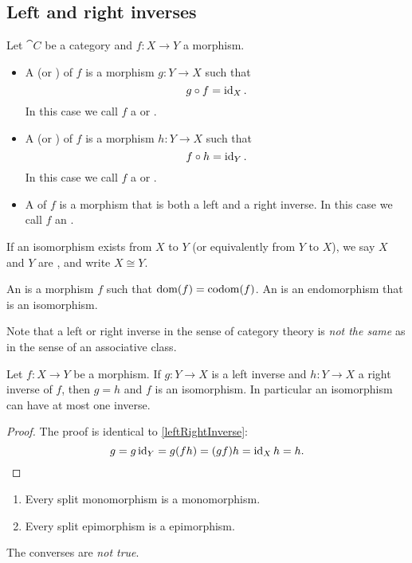 \subsection{Left and right inverses}
\begin{definition}
Let $\cat{C}$ be a category and $f:X\to Y$ a morphism.
\begin{itemize}
\item A  (or ) of $f$ is a morphism $g: Y\to X$ such that
\[ g\circ f = \operatorname{id}_X. \]
In this case we call $f$ a  or .
\item A  (or ) of $f$ is a morphism $h: Y\to X$ such that
\[ f\circ h = \operatorname{id}_Y. \]
In this case we call $f$ a  or .
\item A  of $f$ is a morphism that is both a left and a right inverse. In this case we call $f$ an .
\end{itemize}
If an isomorphism exists from $X$ to $Y$ (or equivalently from $Y$ to $X$), we say $X$ and $Y$ are , and write $X\cong Y$.
\end{definition}

An  is a morphism $f$ such that $\operatorname{dom}(f) = \operatorname{codom}(f)$. An  is an endomorphism that is an isomorphism.

Note that a left or right inverse in the sense of category theory is \emph{not the same} as in the sense of an associative class.

\begin{lemma}
Let $f:X\to Y$ be a morphism. If $g: Y\to X$ is a left inverse and $h: Y\to X$ a right inverse of $f$, then $g=h$ and $f$ is an isomorphism. In particular an isomorphism can have at most one inverse.
\end{lemma}
\begin{proof}
The proof is identical to \ref{leftRightInverse}:
\[ g = g\operatorname{id}_Y = g(fh) = (gf)h = \operatorname{id}_Xh = h. \]
\end{proof}

\begin{lemma}\mbox{}
\begin{enumerate}
\item Every split monomorphism is a monomorphism.
\item Every split epimorphism is a epimorphism.
\end{enumerate}
\end{lemma}
The converses are \emph{not true}.

